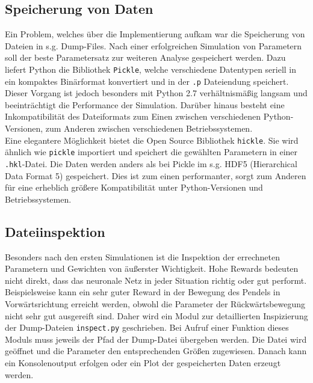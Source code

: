 	\subsection{Speicherung von Daten}
		Ein Problem, welches über die Implementierung aufkam war die Speicherung von Dateien in s.g. Dump-Files. Nach einer erfolgreichen Simulation von Parametern soll der beste Parametersatz zur weiteren Analyse gespeichert werden. Dazu liefert Python die Bibliothek \texttt{Pickle}, welche verschiedene Datentypen seriell in ein kompaktes Binärformat konvertiert und in der \texttt{.p} Dateiendung speichert. Dieser Vorgang ist jedoch besonders mit Python 2.7 verhältnismäßig langsam und beeinträchtigt die Performance der Simulation. Darüber hinaus besteht eine Inkompatibilität des Dateiformats zum Einen zwischen verschiedenen Python-Versionen, zum Anderen zwischen verschiedenen Betriebssystemen.\\
		Eine elegantere Möglichkeit bietet die Open Source Bibliothek \texttt{hickle}. Sie wird ähnlich wie \texttt{pickle} importiert und speichert die gewählten Parametern in einer \texttt{.hkl}-Datei. Die Daten werden anders als bei Pickle im s.g. HDF5 (Hierarchical Data Format 5) gespeichert. Dies ist zum einen performanter, sorgt zum Anderen für eine erheblich größere Kompatibilität unter Python-Versionen und Betriebssystemen.
	\subsection{Dateiinspektion}
		Besonders nach den ersten Simulationen ist die Inspektion der errechneten Parametern und Gewichten von äußerster Wichtigkeit. Hohe Rewards bedeuten nicht direkt, dass das neuronale Netz in jeder Situation richtig oder gut performt. Beispielsweise kann ein sehr guter Reward in der Bewegung des Pendels in Vorwärtsrichtung erreicht werden, obwohl die Parameter der Rückwärtsbewegung nicht sehr gut ausgereift sind. Daher wird ein Modul zur detaillierten Inspizierung der Dump-Dateien \texttt{inspect.py} geschrieben. Bei Aufruf einer Funktion dieses Moduls muss jeweils der Pfad der Dump-Datei übergeben werden. Die Datei wird geöffnet und die Parameter den entsprechenden Größen zugewiesen. Danach kann ein Konsolenoutput erfolgen oder ein Plot der gespeicherten Daten erzeugt werden.


